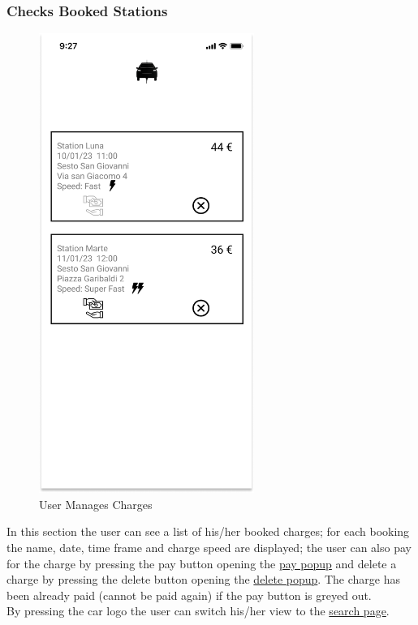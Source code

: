 \subsubsection{Checks Booked Stations}
\begin{figure}[H]
    \centering
    \includegraphics[keepaspectratio, height=15cm]{Mockup/UserAppInterface/My Charges.png}
    \caption{User Manages Charges}
    \label{fig:myCharges}
\end{figure}
In this section the user can see a list of his/her booked charges; for each booking the name, date, time frame and charge speed are displayed; the user can also pay for the charge by pressing the pay button opening the \hyperref[pop:Pay]{pay popup} and delete a charge by pressing the delete button opening the \hyperref[pop:Delete]{delete popup}. The charge has been already paid (cannot be paid again) if the pay button is greyed out.\\
By pressing the car logo the user can switch his/her view to the \hyperref[fig:Search]{search page}.
